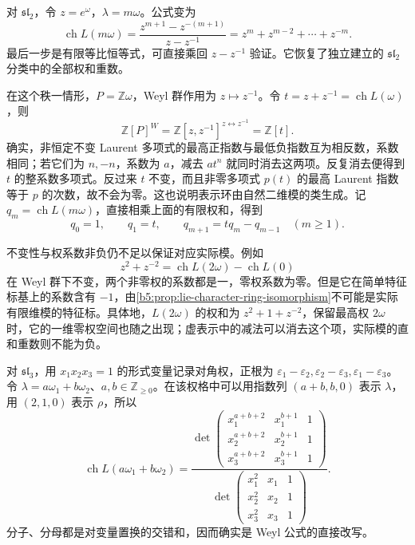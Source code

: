 对 \(\mathfrak{sl}_2\)，令 \(z=e^\omega\)，\(\lambda=m\omega\)。公式变为
\[
	\operatorname{ch}L(m\omega) =\frac{z^{m+1}-z^{-(m+1)}}{z-z^{-1}} =z^m+z^{m-2}+\cdots+z^{-m}.
\]
最后一步是有限等比恒等式，可直接乘回 \(z-z^{-1}\) 验证。它恢复了独立建立的 \(\mathfrak{sl}_2\) 分类中的全部权和重数。

\ProseParagraphBreak

在这个秩一情形，\(P=\mathbb Z\omega\)，Weyl 群作用为 \(z\mapsto z^{-1}\)。令 \(t=z+z^{-1}=\operatorname{ch}L(\omega)\)，则
\[
	\mathbb Z[P]^W=\mathbb Z[z,z^{-1}]^{z\leftrightarrow z^{-1}}=\mathbb Z[t].
\]
确实，非恒定不变 Laurent 多项式的最高正指数与最低负指数互为相反数，系数相同；若它们为 \(n,-n\)，系数为 \(a\)，减去 \(at^n\) 就同时消去这两项。反复消去便得到 \(t\) 的整系数多项式。反过来 \(t\) 不变，而且非零多项式 \(p(t)\) 的最高 Laurent 指数等于 \(p\) 的次数，故不会为零。这也说明表示环由自然二维模的类生成。记 \(q_m=\operatorname{ch}L(m\omega)\)，直接相乘上面的有限权和，得到
\[
	q_0=1,\qquad q_1=t,\qquad q_{m+1}=tq_m-q_{m-1}\quad(m\ge1).
\]

\ProseParagraphBreak

不变性与权系数非负仍不足以保证对应实际模。例如
\[
	z^2+z^{-2}=\operatorname{ch}L(2\omega)-\operatorname{ch}L(0)
\]
在 Weyl 群下不变，两个非零权的系数都是一，零权系数为零。但是它在简单特征标基上的系数含有 \(-1\)，由\cref{b5:prop:lie-character-ring-isomorphism}不可能是实际有限维模的特征标。具体地，\(L(2\omega)\) 的权和为 \(z^2+1+z^{-2}\)，保留最高权 \(2\omega\) 时，它的一维零权空间也随之出现；虚表示中的减法可以消去这个项，实际模的直和重数则不能为负。

\ProseParagraphBreak

对 \(\mathfrak{sl}_3\)，用 \(x_1x_2x_3=1\) 的形式变量记录对角权，正根为 \(\varepsilon_1-\varepsilon_2,\varepsilon_2-\varepsilon_3,\varepsilon_1-\varepsilon_3\)。 令 \(\lambda=a\omega_1+b\omega_2\)、\(a,b\in\mathbb Z_{\ge0}\)。在该权格中可以用指数列 \((a+b,b,0)\) 表示 \(\lambda\)，用 \((2,1,0)\) 表示 \(\rho\)，所以
\begin{equation}\label{b5:eq:sl3-weyl-determinant}
	\operatorname{ch}L(a\omega_1+b\omega_2) =\frac{
		\det\begin{pmatrix}
			x_1^{a+b+2}&x_1^{b+1}&1\\
			x_2^{a+b+2}&x_2^{b+1}&1\\
			x_3^{a+b+2}&x_3^{b+1}&1
		\end{pmatrix}}
	{\det\begin{pmatrix}
			x_1^2&x_1&1\\x_2^2&x_2&1\\x_3^2&x_3&1
		\end{pmatrix}}.
\end{equation}
分子、分母都是对变量置换的交错和，因而确实是 Weyl 公式的直接改写。

